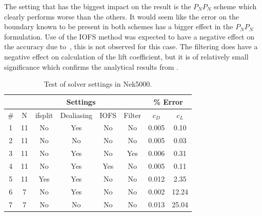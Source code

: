 The setting that has the biggest impact on the result is the $P_NP_N$ scheme which clearly performs 
worse than the others. It would seem like the error on the boundary known to be present in both schemes
has a bigger effect in the $P_NP_N$ formulation.
Use of the IOFS method was expected to have a negative effect on the accuracy due to~\cite{Deville}, 
this is not observed for this case.
The filtering does have a negative effect on calculation of the lift coefficient,
but it is of relatively small significance which confirms the analytical results from . 
%
\begin{table}[h]
    \centering
    \begin{tabular}{c | c c c c c | c c }
         & \multicolumn{5}{|c|}{Settings} & \multicolumn{2}{|c}{\% Error} \\\hline
         \# & N & ifsplit & Dealiasing & IOFS & Filter & $c_D$ & $c_L$ \\  \hline 
         1 &11& No & Yes& No & No & 0.005 & 0.10\\
         2 &11& No & No & No & No & 0.005 & 0.03\\
         3 &11& No & Yes& No & Yes& 0.006 & 0.31\\
         4 &11& No & Yes& Yes& No & 0.005 & 0.11\\
         5 &11& Yes& Yes& No & No & 0.012 & 2.35\\
         6 &7 & No & Yes& No & No & 0.002 & 12.24\\
         7 &7 & No & No & No & No & 0.013 & 25.04\\




    \end{tabular}
    \caption{Test of solver settings in Nek5000.}
    \label{tab:perf}
\end{table}
